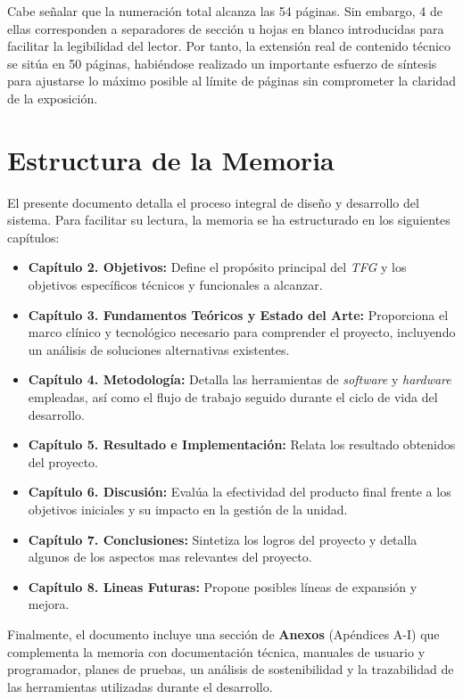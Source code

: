 Cabe señalar que la numeración total alcanza las 54 páginas. Sin embargo, 4 de ellas corresponden a separadores de sección u hojas en blanco introducidas para facilitar la legibilidad del lector. Por tanto, la extensión real de contenido técnico se sitúa en 50 páginas, habiéndose realizado un importante esfuerzo de síntesis para ajustarse lo máximo posible al límite de páginas sin comprometer la claridad de la exposición.

\section{Estructura de la Memoria}

El presente documento detalla el proceso integral de diseño y desarrollo del sistema. Para facilitar su lectura, la memoria se ha estructurado en los siguientes capítulos:

\begin{itemize}
    \item \textbf{Capítulo 2. Objetivos:} Define el propósito principal del \textit{TFG} y los objetivos específicos técnicos y funcionales a alcanzar.
    \item \textbf{Capítulo 3. Fundamentos Teóricos y Estado del Arte:} Proporciona el marco clínico y tecnológico necesario para comprender el proyecto, incluyendo un análisis de soluciones alternativas existentes.
    \item \textbf{Capítulo 4. Metodología:} Detalla las herramientas de \textit{software} y \textit{hardware} empleadas, así como el flujo de trabajo seguido durante el ciclo de vida del desarrollo.
    \item \textbf{Capítulo 5. Resultado e Implementación:} Relata los resultado obtenidos del proyecto.
    \item \textbf{Capítulo 6. Discusión:} Evalúa la efectividad del producto final frente a los objetivos iniciales y su impacto en la gestión de la unidad.
    \item \textbf{Capítulo 7. Conclusiones:} Sintetiza los logros del proyecto y detalla algunos de los aspectos mas relevantes del proyecto. 
    \item \textbf{Capítulo 8. Lineas Futuras:} Propone posibles líneas de expansión y mejora.
\end{itemize}

Finalmente, el documento incluye una sección de \textbf{Anexos} (Apéndices A-I) que complementa la memoria con documentación técnica, manuales de usuario y programador, planes de pruebas, un análisis de sostenibilidad y la trazabilidad de las herramientas utilizadas durante el desarrollo.







